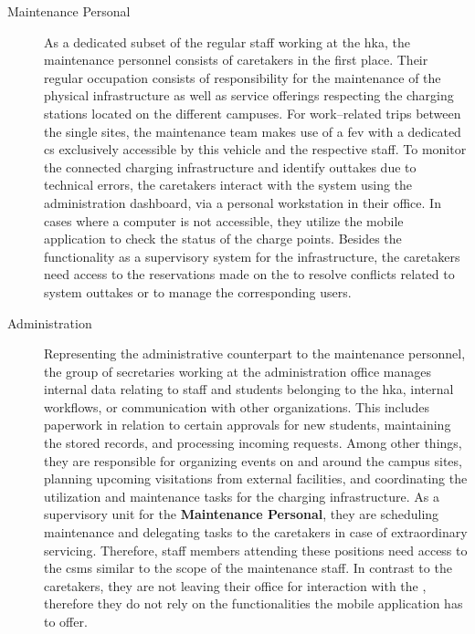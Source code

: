 \newpage

\begin{description}
    \item[Maintenance Personal] As a dedicated subset of the regular staff working at the \acrshort{hka}, the maintenance personnel consists of caretakers in the first place. Their regular occupation consists of responsibility for the maintenance of the physical infrastructure as well as service offerings respecting the charging stations located on the different campuses.
    For work--related trips between the single sites, the maintenance team makes use of a \acrshort{fev} with a dedicated \acrshort{cs} exclusively accessible by this vehicle and the respective staff.
    To monitor the connected charging infrastructure and identify outtakes due to technical errors, the caretakers interact with the system using the administration dashboard, via a personal workstation in their office. In cases where a computer is not accessible, they utilize the mobile application to check the status of the charge points.
    Besides the functionality as a supervisory system for the infrastructure, the caretakers need access to the reservations made on the  to resolve conflicts related to system outtakes or to manage the corresponding users.
    \item[Administration] Representing the administrative counterpart to the maintenance personnel, the group of secretaries working at the administration office manages internal data relating to staff and students belonging to the \acrshort{hka}, internal workflows, or communication with other organizations. 
    This includes paperwork in relation to certain approvals for new students, maintaining the stored records, and processing incoming requests. Among other things, they are responsible for organizing events on and around the campus sites, planning upcoming visitations from external facilities, and coordinating the utilization and maintenance tasks for the charging infrastructure.
    As a supervisory unit for the \textbf{Maintenance Personal}, they are scheduling maintenance and delegating tasks to the caretakers in case of extraordinary servicing.  
    Therefore, staff members attending these positions need access to the \acrshort{csms} similar to the scope of the maintenance staff. In contrast to the caretakers, they are not leaving their office for interaction with the , therefore they do not rely on the functionalities the mobile application has to offer.
\end{description}

